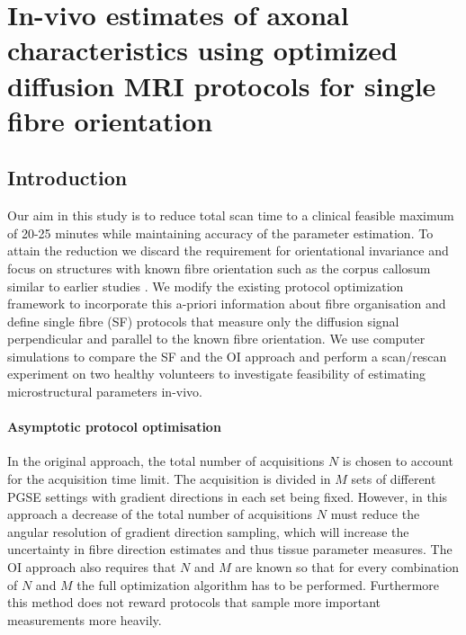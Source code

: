 \section{In-vivo estimates of axonal characteristics using optimized diffusion MRI protocols for single fibre orientation}
\subsection*{Introduction}
Our aim in this study is to reduce total scan time to a clinical feasible maximum of 20-25 minutes while maintaining accuracy of the parameter estimation. To attain the reduction we discard the requirement for orientational invariance and focus on structures with known fibre orientation such as the corpus callosum similar to earlier studies \cite{assaf2008,barazany2009}. We modify the existing protocol optimization framework \cite{alexander2008} to incorporate this a-priori information about fibre organisation and define single fibre (SF) protocols that measure only the diffusion signal perpendicular and parallel to the known fibre orientation. We use computer simulations to compare the SF and the OI approach and perform a scan/rescan experiment on two healthy volunteers to investigate feasibility of estimating microstructural parameters in-vivo. 

\paragraph{Asymptotic protocol optimisation}
In the original approach, the total number of acquisitions $N$ is chosen to account for the acquisition time limit. The acquisition is divided in $M$ sets of different PGSE settings with gradient directions in each set being fixed. However, in this approach a decrease of the total number of acquisitions $N$ must reduce the angular resolution of gradient direction sampling, which will increase the uncertainty in fibre direction estimates and thus tissue parameter measures. The OI approach also requires that $N$ and $M$ are known so that for every combination of $N$ and $M$ the full optimization algorithm has to be performed. Furthermore this method does not reward protocols that sample more important measurements more heavily.

